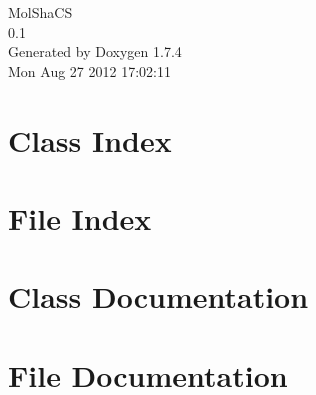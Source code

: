 \documentclass[a4paper]{book}
\begin{document}
\hypersetup{pageanchor=false}
\begin{titlepage}
\vspace*{7cm}
\begin{center}
{\Large MolShaCS \\[1ex]\large 0.1 }\\
\vspace*{1cm}
{\large Generated by Doxygen 1.7.4}\\
\vspace*{0.5cm}
{\small Mon Aug 27 2012 17:02:11}\\
\end{center}
\end{titlepage}
\clearemptydoublepage
{}
\tableofcontents
\clearemptydoublepage
{}
\hypersetup{pageanchor=true}
\chapter{Class Index}

\chapter{File Index}

\chapter{Class Documentation}













\chapter{File Documentation}





























\printindex
\end{document}
